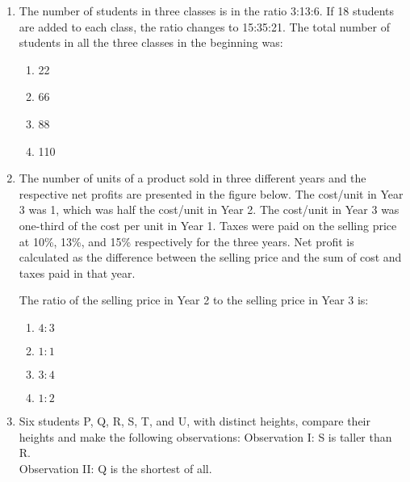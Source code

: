 \documentclass[journal,12pt,onecolumn]{IEEEtran}
\theoremstyle{remark}
\begin{document}
\begin{enumerate}
\begin{enumerate}
\begin{figure}[H]
    \end{figure}
        \item  \begin{figure}[H]
        \centering
         
    \end{figure}
        \item  \begin{figure}[H]
        \centering
         
    \end{figure}
    \end{enumerate}
    \item The number of students in three classes is in the ratio 3:13:6. If 18 students are added to each class, the ratio changes to 15:35:21.
    The total number of students in all the three classes in the beginning was:
    \begin{enumerate}
        \item 22
        \item 66
        \item 88
        \item 110
    \end{enumerate}
    \item The number of units of a product sold in three different years and the respective net profits are presented in the figure below. The cost/unit in Year 3 was 1, which was half the cost/unit in Year 2. The cost/unit in Year 3 was one-third of the cost per unit in Year 1. Taxes were paid on the selling price at 10\%, 13\%, and 15\% respectively for the three years. Net profit is calculated as the difference between the selling price and the sum of cost and taxes paid in that year.
   \begin{figure}[H]
        \centering
          
    \end{figure}
    The ratio of the selling price in Year 2 to the selling price in Year 3 is:
    \begin{enumerate}
        \item $4:3$
        \item $1:1$
        \item $3:4$
        \item $1:2$
    \end{enumerate}
    \item Six students P, Q, R, S, T, and U, with distinct heights, compare their heights and make the following observations:
    Observation I: S is taller than R. \\
    Observation II: Q is the shortest of all. \\

\end{enumerate}
\end{document}
